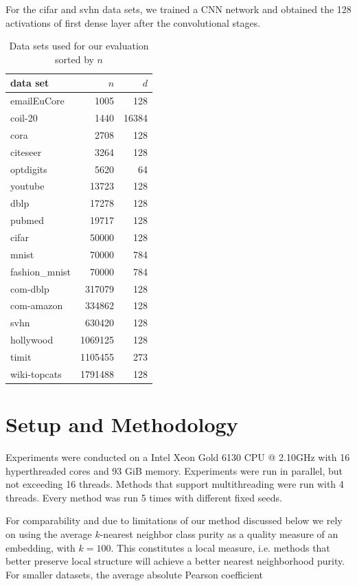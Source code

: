 For the cifar and svhn data sets, we trained a CNN network and obtained the 128
activations of first dense layer after the convolutional stages.

\begin{table}[tb]
  \centering
  \begin{tabular}{lrr}
    \toprule
    data set & $n$ & $d$ \\ \midrule
    emailEuCore & \num{1005} & \num{128} \\
coil-20 & \num{1440} & \num{16384} \\
cora & \num{2708} & \num{128} \\
citeseer & \num{3264} & \num{128} \\
optdigits & \num{5620} & \num{64} \\
youtube & \num{13723} & \num{128} \\
dblp & \num{17278} & \num{128} \\
pubmed & \num{19717} & \num{128} \\
cifar & \num{50000} & \num{128} \\
mnist & \num{70000} & \num{784} \\
fashion\_mnist & \num{70000} & \num{784} \\
com-dblp & \num{317079} & \num{128} \\
com-amazon & \num{334862} & \num{128} \\
svhn & \num{630420} & \num{128} \\
hollywood & \num{1069125} & \num{128} \\
timit & \num{1105455} & \num{273} \\
wiki-topcats & \num{1791488} & \num{128} \\
    \bottomrule
  \end{tabular}
  \caption{Data sets used for our evaluation sorted by $n$}
  \label{tab:datasets}
\end{table}

\section{Setup and Methodology}

Experiments were conducted on a Intel Xeon Gold 6130 CPU @ 2.10GHz with 16
hyperthreaded cores and 93 GiB memory. Experiments were run in parallel, but
not exceeding 16 threads. Methods that support multithreading were run with 4
threads. Every method was run 5 times with different fixed seeds.

For comparability and due to limitations of our method discussed below we rely
on using the average $k$-nearest neighbor class purity as a quality measure of
an embedding, with $k = 100$. This constitutes a local measure, i.e. methods
that better preserve local structure will achieve a better nearest neighborhood
purity. For smaller datasets, the average absolute Pearson coefficient

